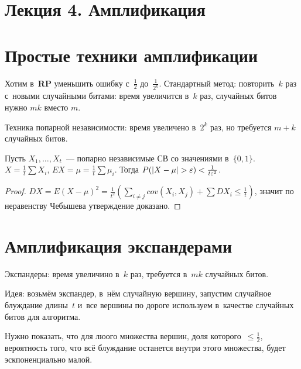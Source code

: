 \documentclass{article}
\begin{document}
\section*{Лекция 4. Амплификация}
\resetcntrs

\section{Простые техники амплификации}

Хотим в~\textbf{RP} уменьшить ошибку с~$\frac{1}{2}$ до~$\frac{1}{2^k}$.
Стандартный метод: повторить~$k$ раз с~новыми случайными битами: время
увеличится в~$k$ раз, случайных битов нужно $mk$ вместо $m$.

Техника попарной независимости: время увеличено в~$2^k$ раз, но требуется $m +
k$ случайных битов.

\begin{claim}
	Пусть $X_1, \ldots, X_t$~--- попарно независимые СВ со значениями
	в~$\{0, 1\}$. $X = \frac{1}{t} \sum X_i$, $EX = \mu = \frac{1}{t} \sum \mu_i$.
	Тогда $P(|X - \mu| > \varepsilon) < \frac{1}{t\varepsilon^2}$.
\end{claim}
\begin{proof}
	$DX = E(X - \mu)^2 = \frac{1}{t^2} \left(\sum\limits_{i\ne j} cov(X_i, X_j)
	+ \sum DX_i \le \frac{1}{t}\right)$, значит по неравенству Чебышева
	утверждение доказано.
\end{proof}

\section{Амплификация экспандерами}

Экспандеры: время увеличино в~$k$ раз, требуется в~$mk$ случайных битов.

Идея: возьмём экспандер, в~нём случайную вершину, запустим случайное блуждание
длины~$t$ и~все вершины по дороге используем в~качестве случайных битов для
алгоритма.

Нужно показать, что для люого множества вершин, доля которого~$\le \frac{1}{2}$,
вероятность того, что всё блуждание останется внутри этого множества, будет
эскпоненциально малой.
\end{document}
